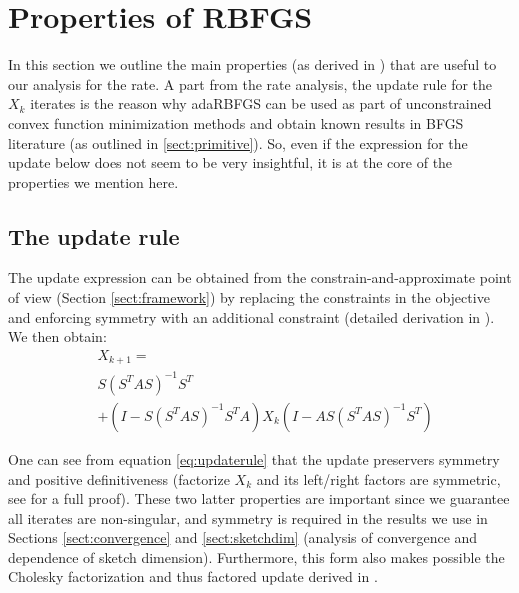 \documentclass[12pt,conference,compsocconf]{IEEEtran}
\begin{document}
\section{Properties of RBFGS}\label{sect:propertiesRBFGS}
In this section we outline the main properties (as derived in \cite{Gower1}) that are useful to our analysis for the rate. A part from the rate analysis, the update rule for the $X_k$ iterates is the reason why adaRBFGS can be used as part of unconstrained convex function minimization methods and obtain known results in BFGS literature (as outlined in \ref{sect:primitive}). So, even if the expression for the update below does not seem to be very insightful, it is at the core of the properties we mention here.

\subsection{The update rule}
The update expression can be obtained from the constrain-and-approximate point of view (Section \ref{sect:framework}) by replacing the constraints in the objective and enforcing symmetry with an additional constraint (detailed derivation in \cite{Gower1}). We then obtain:
\begin{align}\label{eq:updaterule}
	&X_{k+1}=\\ \nonumber
    	&S(S^TAS)^{-1}S^T\\ \nonumber
	    &+ (I-S(S^TAS)^{-1}S^TA)X_k(I-AS(S^TAS)^{-1}S^T) \nonumber
\end{align}

One can see from equation \ref{eq:updaterule} that the update preservers symmetry and positive definitiveness (factorize $X_k$ and its left/right factors are symmetric, see \cite{Gower1} for a full proof). These two latter properties are important since we guarantee all iterates are non-singular, and symmetry is required in the results we use in Sections \ref{sect:convergence} and \ref{sect:sketchdim} (analysis of convergence and dependence of sketch dimension). Furthermore, this form also makes possible the Cholesky factorization and thus factored update derived in \cite{Gratton}.
\end{document}
